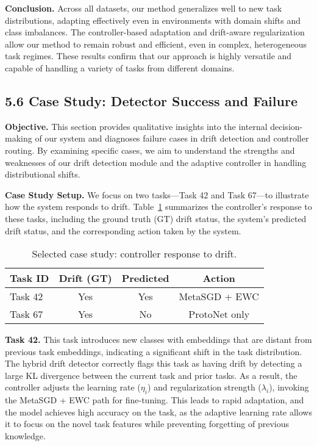 \documentclass[conference]{IEEEtran}
\begin{document}
\textbf{Conclusion.}  
Across all datasets, our method generalizes well to new task distributions, adapting effectively even in environments with domain shifts and class imbalances. The controller-based adaptation and drift-aware regularization allow our method to remain robust and efficient, even in complex, heterogeneous task regimes. These results confirm that our approach is highly versatile and capable of handling a variety of tasks from different domains.


\subsection{5.6 Case Study: Detector Success and Failure}

\textbf{Objective.}  
This section provides qualitative insights into the internal decision-making of our system and diagnoses failure cases in drift detection and controller routing. By examining specific cases, we aim to understand the strengths and weaknesses of our drift detection module and the adaptive controller in handling distributional shifts.

\textbf{Case Study Setup.}  
We focus on two tasks—Task 42 and Task 67—to illustrate how the system responds to drift. Table~\ref{tab:case_drift} summarizes the controller’s response to these tasks, including the ground truth (GT) drift status, the system’s predicted drift status, and the corresponding action taken by the system.

\begin{table}[ht]
\centering
\caption{Selected case study: controller response to drift.}
\begin{tabular}{@{}lccc@{}}
\toprule
\textbf{Task ID} & \textbf{Drift (GT)} & \textbf{Predicted} & \textbf{Action} \\
\midrule
Task 42 & Yes  & Yes  & MetaSGD + EWC \\
Task 67 & Yes  & No   & ProtoNet only \\
\bottomrule
\end{tabular}
\label{tab:case_drift}
\end{table}

\textbf{Task 42.}  
This task introduces new classes with embeddings that are distant from previous task embeddings, indicating a significant shift in the task distribution. The hybrid drift detector correctly flags this task as having drift by detecting a large KL divergence between the current task and prior tasks. As a result, the controller adjusts the learning rate ($\eta_i$) and regularization strength ($\lambda_i$), invoking the MetaSGD + EWC path for fine-tuning. This leads to rapid adaptation, and the model achieves high accuracy on the task, as the adaptive learning rate allows it to focus on the novel task features while preventing forgetting of previous knowledge.
\end{document}
